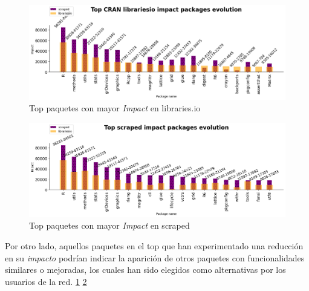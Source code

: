 \begin{figure}[h!]
    \begin{center}
        \includegraphics[width=1\textwidth]{img/cran/impact_top_libio.png}
        \caption{Top paquetes con mayor \textit{Impact} en libraries.io}
        \label{fig:Top impact libraries.io}
    \end{center}
\end{figure}

\begin{figure}[h!]
    \begin{center}
        \includegraphics[width=1\textwidth]{img/cran/impact_top_scraped.png}
        \caption{Top paquetes con mayor \textit{Impact} en scraped}
        \label{fig:Top impact scraped}
    \end{center}
\end{figure}

Por otro lado, aquellos paquetes en el top que han experimentado una reducción en su \textit{impacto}
podrían indicar la aparición de otros paquetes con funcionalidades similares o mejoradas, los cuales han
sido elegidos como alternativas por los usuarios de la red. \ref{fig:Top impact libraries.io} \ref{fig:Top impact scraped}


